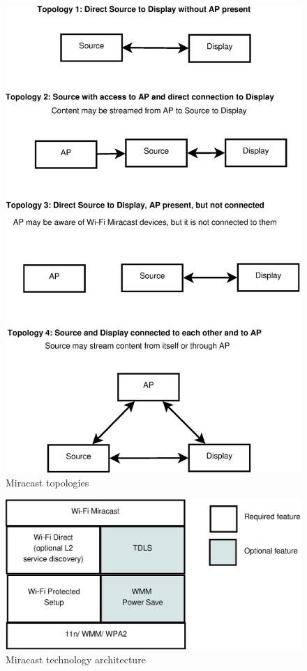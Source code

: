 \begin{figure}[htb] \centering 
\hspace*{2cm} \includegraphics[width=0.9\columnwidth]{charts/miracast_model} 
\caption{Miracast topologies \label{miracast_model}} 
\end{figure} 

\begin{figure}[htb] \centering 
\includegraphics[width=0.9\columnwidth]{charts/miracast_technology_architecture} 
\caption{Miracast technology architecture \label{miracast_architect}} 
\end{figure} 

